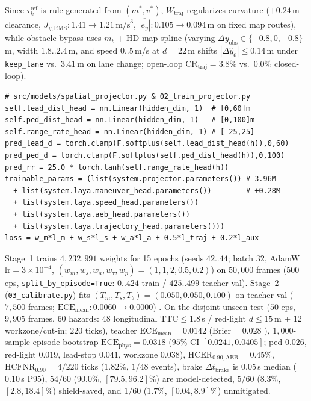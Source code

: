 \documentclass[10pt,twocolumn,letterpaper]{article}
\begin{document}
Since $\tau^{\text{ref}}_k$ is rule-generated from $(m^*, v^*)$, $W_{\text{traj}}$ regularizes curvature ($+0.24$\,m clearance, $J_{y,\text{RMS}}: 1.41 \to 1.21\,\text{m/s}^3$, $\overline{|e_y|}: 0.105 \to 0.094$\,m on fixed map routes), while obstacle bypass uses $m_t$ + HD-map spline (varying $\Delta y_{\text{obs}} \in \{-0.8, 0, +0.8\}$\,m, width $1.8..2.4$\,m, and speed $0..5$\,m/s at $d=22$\,m shifts $|\Delta\hat{y}_6| \le 0.14$\,m under \texttt{keep\_lane} vs.\ $3.41$\,m on lane change; open-loop $\text{CR}_{\text{traj}}=3.8\%$ vs.\ $0.0\%$ closed-loop).
\begin{scriptsize}
\begin{verbatim}
# src/models/spatial_projector.py & 02_train_projector.py
self.lead_dist_head = nn.Linear(hidden_dim, 1)  # [0,60]m
self.ped_dist_head = nn.Linear(hidden_dim, 1)   # [0,100]m
self.range_rate_head = nn.Linear(hidden_dim, 1) # [-25,25]
pred_lead_d = torch.clamp(F.softplus(self.lead_dist_head(h)),0,60)
pred_ped_d = torch.clamp(F.softplus(self.ped_dist_head(h)),0,100)
pred_rr = 25.0 * torch.tanh(self.range_rate_head(h))
trainable_params = (list(system.projector.parameters()) # 3.96M
  + list(system.laya.maneuver_head.parameters())        # +0.28M
  + list(system.laya.speed_head.parameters())
  + list(system.laya.aeb_head.parameters())
  + list(system.laya.trajectory_head.parameters()))
loss = w_m*l_m + w_s*l_s + w_a*l_a + 0.5*l_traj + 0.2*l_aux
\end{verbatim}
\end{scriptsize}
Stage~1 trains $4,232,991$ weights for 15 epochs (seeds $42..44$; batch 32, AdamW \cite{loshchilov2019decoupled} $\text{lr}=3\times 10^{-4}$, $(w_m,w_s,w_a,w_\tau,w_p)=(1,1,2,0.5,0.2)$) on $50,000$ frames ($500$ eps, \texttt{split\_by\_episode=True}: $0..424$ train / $425..499$ teacher val). Stage~2 (\texttt{03\_calibrate.py}) fits $(T_m, T_s, T_b) = (0.050, 0.050, 0.100)$ on teacher val ($7,500$ frames; $\text{ECE}_{\text{mean}}: 0.0060 \to 0.0000$) \cite{guo2017calibration,zadrozny2002transforming}. On the disjoint unseen test ($50$ eps, $9,905$ frames, $60$ hazards: $48$ longitudinal $\text{TTC}\le 1.8$\,s / red-light $d\le 15$\,m + $12$ workzone/cut-in; $220$ ticks), teacher $\text{ECE}_{\text{mean}}=0.0142$ ($\text{Brier}=0.028$ \cite{brier1950verification}), $1,000$-sample episode-bootstrap $\text{ECE}_{\text{phys}}=0.0318$ ($95\%$ CI $[0.0241, 0.0405]$; ped $0.026$, red-light $0.019$, lead-stop $0.041$, workzone $0.038$), $\text{HCER}_{0.90,\text{AEB}}=0.45\%$, $\text{HCFNR}_{0.90}=4/220$ ticks ($1.82\%$, $1/48$ events), brake $\Delta t_{\text{brake}}$ is $0.05$\,s median ($0.10$\,s P95), $54/60$ ($90.0\%$, $[79.5, 96.2]\%$) are model-detected, $5/60$ ($8.3\%$, $[2.8, 18.4]\%$) shield-saved, and $1/60$ ($1.7\%$, $[0.04, 8.9]\%$) unmitigated.
\end{document}
